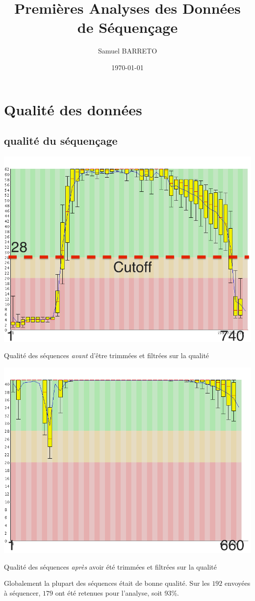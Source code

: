 \documentclass[a4paper]{tufte-handout}
\author{Samuel BARRETO}
\date{\today}
\title{Premières Analyses des Données de Séquençage}
\begin{document}
\maketitle

\section{Qualité des données}
\label{sec:orgheadline4}
\subsection{qualité du séquençage}
\label{sec:orgheadline1}
\begin{marginfigure}
  \includegraphics[width=\linewidth]{../untrimmed.png}
  \caption{Qualité des séquences \emph{avant} d'être trimmées et filtrées
      sur la qualité}
\end{marginfigure}

\begin{marginfigure}
  \includegraphics[width=\linewidth]{../trimmed.png}
  \caption{Qualité des séquences \emph{après} avoir été trimmées et filtrées
      sur la qualité}
\end{marginfigure}
Globalement la plupart des séquences était de bonne qualité. Sur les \(192\)
envoyées à séquencer, \(179\) ont été retenues pour l'analyse, soit 93\%.
\end{document}
